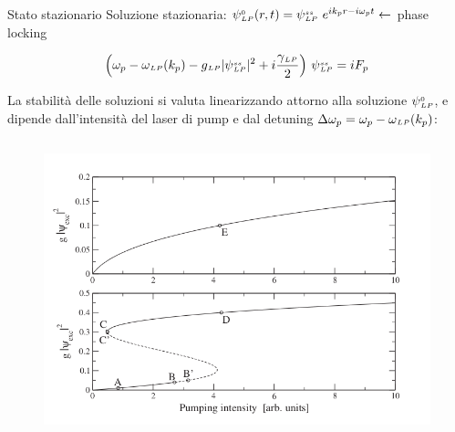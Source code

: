 \documentclass[10pt]{beamer}
\begin{document}
\begin{frame}{Stato stazionario}
%
Soluzione stazionaria: \( \psi{\scriptstyle ^{0}_{LP}}(r,t) = \psi{\scriptstyle ^{ss}_{LP}} \ e^{ik_pr - i\omega_p t}  \leftarrow\) \alert{phase locking}

\[
 \left( \omega_p - \omega{\scriptstyle _{LP}} (k_p) - g{\scriptstyle _{LP}} |\psi{\scriptstyle ^{ss}_{LP}}|^2 + i \frac{\gamma{\scriptstyle _{LP}}}{2} \right)\, \psi{\scriptstyle ^{ss}_{LP}} = i F_p
\]



\begin{figure}
 \end{figure}

La stabilità delle soluzioni si valuta linearizzando attorno alla soluzione $\psi{\scriptstyle ^{0}_{LP}}$, e dipende dall'intensità del laser di pump e dal detuning \(\Delta \omega_p = \omega_p - \omega{\scriptstyle _{LP}}(k_p)\):
\begin{columns}[t]
 \begin{column}{.5\textwidth}
  \begin{figure}
   \includegraphics[width=\columnwidth]{pics/Shapevspump.png}
  \end{figure}

 \end{column}


\end{columns}
\end{frame}
\end{document}
